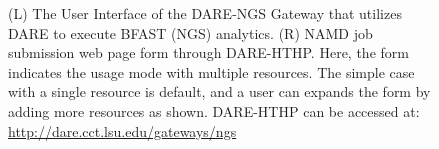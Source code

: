 \documentclass[]{svjour3}
\begin{document}
\begin{figure}
 \centering
  \caption{\small (L) The User Interface of the DARE-NGS Gateway that
    utilizes DARE to execute BFAST (NGS) analytics. (R) NAMD job
    submission web page form through DARE-HTHP. Here, the form
    indicates the usage mode with multiple resources. The simple case
    with a single resource is default, and a user can expands the form
    by adding more resources as shown. DARE-HTHP can be accessed at:
    \url{http://dare.cct.lsu.edu/gateways/ngs} }
  \label{fig:NAMD2}
\end{figure}
\end{document}
